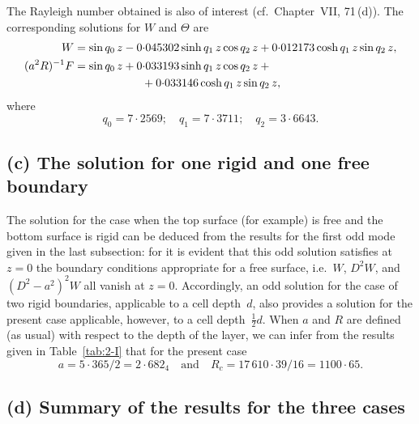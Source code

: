 The Rayleigh number obtained is also of interest (cf.\ Chapter~VII, 71\,(d)).
The corresponding solutions for $W$ and $\Theta$ are
\begin{align}
\label{eq:2-225a}
W &= \sin q_0\,z - 0{\cdot}045302\sinh q_1\,z\cos q_2\,z + 0{\cdot}012173\cosh q_1\,z\sin q_2\,z, \notag\\
(a^2 R)^{-1}F &= \sin q_0\,z + 0{\cdot}033193\sinh q_1\,z\cos q_2\,z + {} \notag\\
&\qquad\qquad\qquad{} + 0{\cdot}033146\cosh q_1\,z\sin q_2\,z,
\end{align}
where
\begin{equation}
\label{eq:2-225p}
q_0 = 7{\cdot}2569;\quad q_1 = 7{\cdot}3711;\quad q_2 = 3{\cdot}6643.
\end{equation}


\subsection*{(c) The solution for one rigid and one free boundary}

The solution for the case when the top surface (for example) is free
and the bottom surface is rigid can be deduced from the results for the
first odd mode given in the last subsection: for it is evident that this odd
solution satisfies at $z = 0$ the boundary conditions appropriate for a
free surface, i.e.\ $W$, $D^2W$, and $(D^2 - a^2)^2W$ all vanish at $z = 0$.
Accordingly, an odd solution for the case of two rigid boundaries, applicable
to a cell depth~$d$, also provides a solution for the present case applicable,
however, to a cell depth~$\tfrac{1}{2}d$. When $a$ and $R$ are defined (as usual) with
respect to the depth of the layer, we can infer from the results given in
Table~\ref{tab:2-I} that for the present case
\begin{equation}
\label{eq:2-226b}
a = 5{\cdot}365/2 = 2{\cdot}682_4 \quad\text{and}\quad R_c = 17\,610{\cdot}39/16 = 1100{\cdot}65.
\end{equation}

\subsection*{(d) Summary of the results for the three cases}

